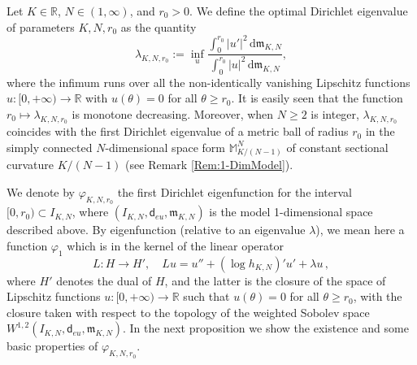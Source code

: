 \documentclass[12pt]{article}
\newcommand{\R}{\mathbb{R}}
\newcommand{\dd}{\mathrm{d}}
\newcommand{\mm}{\mathfrak m}
\newcommand{\di}{\mathsf{d}}
\theoremstyle{plain}
\theoremstyle{definition}
\begin{document}
Let $K\in \mathbb{R}$, $N\in(1,\infty)$, and $r_0>0$. We define the optimal Dirichlet eigenvalue of parameters $K,N,r_0$ as the quantity
\begin{equation}\label{def: firsteigen opt}
    \lambda_{K,N,r_0}:=\inf_{u}\frac{\int_{0}^{r_0}|u'|^2\,\dd  \mm_{K,N}}{\int_{0}^{r_0}|u|^2\,\dd  \mm_{K,N}},
\end{equation}
where the infimum runs over all the non-identically vanishing Lipschitz functions $u:[0,+\infty)\to \R$ with $u(\theta)=0$ for all $\theta\ge r_0$. It is easily seen that the function $r_0\mapsto \lambda_{K,N,r_0}$ is monotone decreasing. Moreover, when $N\geq 2$ is integer, $\lambda_{K,N,r_0}$ coincides with the first Dirichlet eigenvalue of a metric ball of radius $r_0$ in the simply connected $N$-dimensional space form $\mathbb{M}^N_{K/(N-1)}$  of constant sectional curvature $K/(N-1)$ (see Remark \ref{Rem:1-DimModel}).

We denote by $\varphi_{K,N,r_0}$ the first Dirichlet eigenfunction for the interval $[0,r_0)\subset I_{K,N}$, where $( I_{K,N},   \di_{eu},  \mm_{K,N})$ is the model 1-dimensional space described above. 
By eigenfunction (relative to an eigenvalue $\lambda$), we mean here a function $\varphi_1$ which is in the kernel of the linear operator
\begin{equation}
L: H\to H', \quad Lu= u''+ (\log h_{K,N})' u' + \lambda u\,,
\end{equation}
where $H'$ denotes the dual of $H$, and the latter is the closure of the space of Lipschitz functions $u:[0,+\infty)\rightarrow \R$ such that $u(\theta)=0$ for all $\theta\ge r_0$, with the closure taken with respect to the topology of the weighted Sobolev space $W^{1,2}(I_{K,N},\di_{eu},\mm_{K,N})$. In the next proposition we show the existence and some basic properties of $\varphi_{K,N,r_0}$.
\end{document}
